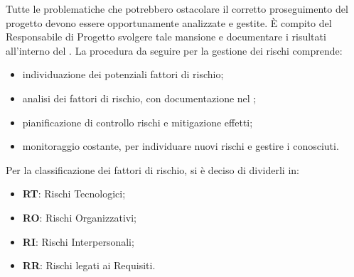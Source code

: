 			
			Tutte le problematiche che potrebbero ostacolare il corretto proseguimento del progetto devono essere opportunamente analizzate e gestite. È compito del Responsabile di Progetto svolgere tale mansione e documentare i risultati all'interno del . La procedura da seguire per la gestione dei rischi comprende:
			\begin{itemize}
				\item individuazione dei potenziali fattori di rischio;
				\item analisi dei fattori di rischio, con documentazione nel ;
				\item pianificazione di controllo rischi e mitigazione effetti;
				\item monitoraggio costante, per individuare nuovi rischi e gestire i conosciuti.
			\end{itemize}
			Per la classificazione dei fattori di rischio, si è deciso di dividerli in:
			\begin{itemize}
				\item \textbf{RT}: Rischi Tecnologici;
				\item \textbf{RO}: Rischi Organizzativi;
				\item \textbf{RI}: Rischi Interpersonali;
				\item \textbf{RR}: Rischi legati ai Requisiti.
			\end{itemize}
